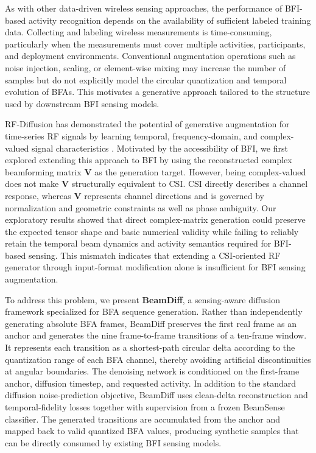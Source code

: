As with other data-driven wireless sensing approaches, the performance of
BFI-based activity recognition depends on the availability of sufficient labeled
training data. Collecting and labeling wireless measurements is time-consuming,
particularly when the measurements must cover multiple activities, participants,
and deployment environments. Conventional augmentation operations such as noise
injection, scaling, or element-wise mixing may increase the number of samples but
do not explicitly model the circular quantization and temporal evolution of BFAs.
This motivates a generative approach tailored to the structure used by downstream
BFI sensing models.

RF-Diffusion has demonstrated the potential of generative augmentation for
time-series RF signals by learning temporal, frequency-domain, and complex-valued
signal characteristics \cite{chi2024rfdiffusion}. Motivated by the accessibility
of BFI, we first explored extending this approach to BFI by using the reconstructed
complex beamforming matrix $\mathbf{V}$ as the generation target. However, being
complex-valued does not make $\mathbf{V}$ structurally equivalent to CSI. CSI
directly describes a channel response, whereas $\mathbf{V}$ represents channel
directions and is governed by normalization and geometric constraints as well as
phase ambiguity. Our exploratory results showed that direct complex-matrix
generation could preserve the expected tensor shape and basic numerical validity
while failing to reliably retain the temporal beam dynamics and activity semantics
required for BFI-based sensing. This mismatch indicates that extending a
CSI-oriented RF generator through input-format modification alone is insufficient
for BFI sensing augmentation.

To address this problem, we present \textbf{BeamDiff}, a sensing-aware diffusion
framework specialized for BFA sequence generation. Rather than independently
generating absolute BFA frames, BeamDiff preserves the first real frame as an
anchor and generates the nine frame-to-frame transitions of a ten-frame window.
It represents each transition as a shortest-path circular delta according to the
quantization range of each BFA channel, thereby avoiding artificial discontinuities
at angular boundaries. The denoising network is conditioned on the first-frame
anchor, diffusion timestep, and requested activity. In addition to the standard
diffusion noise-prediction objective, BeamDiff uses clean-delta reconstruction and
temporal-fidelity losses together with supervision from a frozen BeamSense
classifier. The generated transitions are accumulated from the anchor and mapped
back to valid quantized BFA values, producing synthetic samples that can be
directly consumed by existing BFI sensing models.

